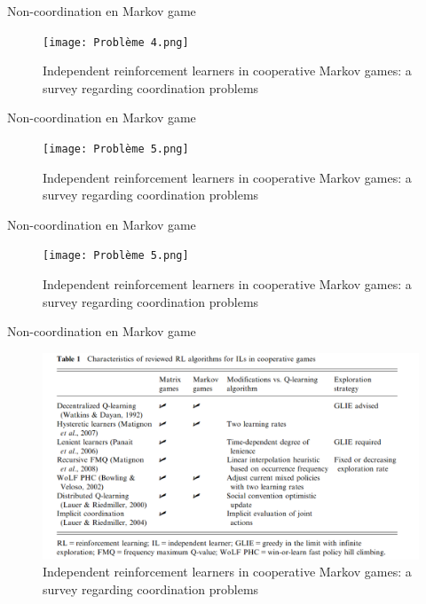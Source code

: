 \documentclass[aspectratio=169,xcolor=dvipsnames]{beamer}
\begin{document}
\begin{frame}{Non-coordination en Markov game}
  \begin{figure}
    \centering
    \texttt{[image: Problème 4.png]}
    \caption{\citet{matignon_independent_2012} Independent reinforcement learners in cooperative Markov games: a survey regarding coordination problems}
  \end{figure}
\end{frame}

\begin{frame}{Non-coordination en Markov game}
  \begin{figure}
    \centering
    \texttt{[image: Problème 5.png]}
    \caption{\citet{matignon_independent_2012} Independent reinforcement learners in cooperative Markov games: a survey regarding coordination problems}
  \end{figure}
\end{frame}

\begin{frame}{Non-coordination en Markov game}
  \begin{figure}
    \centering
    \texttt{[image: Problème 5.png]}
    \caption{\citet{matignon_independent_2012} Independent reinforcement learners in cooperative Markov games: a survey regarding coordination problems}
  \end{figure}
\end{frame}

\begin{frame}{Non-coordination en Markov game}
  \begin{figure}
    \centering
    \includegraphics[scale=0.20]{algo modification.png}
    \caption{\citet{matignon_independent_2012} Independent reinforcement learners in cooperative Markov games: a survey regarding coordination problems}
  \end{figure}
\end{frame}
\end{document}
